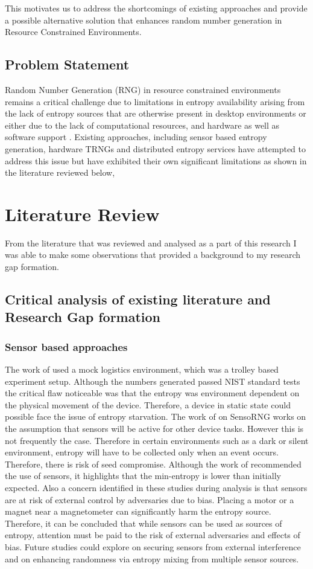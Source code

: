 \documentclass[a4paper, 12pt]{article}
\begin{document}
This motivates us to address the shortcomings of existing approaches and provide a possible alternative solution that enhances random number generation in Resource Constrained Environments.

\subsection{Problem Statement}
Random Number Generation (RNG) in resource constrained environments remains a critical challenge due to limitations in entropy availability arising from the lack of entropy sources that are otherwise present in desktop environments or either due to the lack of computational resources, and hardware as well as software support \citep{kietzmann2020prng}. Existing approaches, including sensor based entropy generation, hardware TRNGs and distributed entropy services have attempted to address this issue but have exhibited their own significant limitations as shown in the literature reviewed below,

\section{Literature Review}
From the literature that was reviewed and analysed as a part of this research I was able to make some observations that provided a background to my research gap formation.

\subsection{Critical analysis of existing literature and Research Gap formation}
\subsubsection{Sensor based approaches}
The work of \citet{Ullah2020PerCom} used a mock logistics environment, which was a trolley based experiment setup. Although the numbers generated passed \ac{NIST} standard tests the critical flaw noticeable was that the entropy was environment dependent on the physical movement of the device. Therefore, a device in static state could possible face the issue of entropy starvation. The work of \citet{wallace2018} on SensoRNG works on the assumption that sensors will be active for other device tasks. However this is not frequently the case. Therefore in certain environments such as a dark or silent environment, entropy will have to be collected only when an event occurs. Therefore, there is risk of seed compromise. Although the work of \citet{hennebert2021entropy} recommended the use of sensors, it highlights that the min-entropy is lower than initially expected. Also a concern identified in these studies during analysis is that sensors are at risk of external control by adversaries due to bias. Placing a motor or a magnet near a magnetometer can significantly harm the entropy source. Therefore, it can be concluded that while sensors can be used as sources of entropy, attention must be paid to the risk of external adversaries and effects of bias. Future studies could explore on securing sensors from external interference and on enhancing randomness via entropy mixing from multiple sensor sources.
\end{document}
